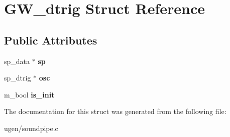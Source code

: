 \hypertarget{structGW__dtrig}{}\section{G\+W\+\_\+dtrig Struct Reference}
\label{structGW__dtrig}
\subsection*{Public Attributes}
\begin{DoxyCompactItemize}
\item 
\hypertarget{structGW__dtrig_acc37a380fd7b0d3cc3586b2cffd28155}{}\label{structGW__dtrig_acc37a380fd7b0d3cc3586b2cffd28155} 
sp\+\_\+data $\ast$ {\bfseries sp}
\item 
\hypertarget{structGW__dtrig_a3df2d1dc96272d163bed72061708cf1f}{}\label{structGW__dtrig_a3df2d1dc96272d163bed72061708cf1f} 
sp\+\_\+dtrig $\ast$ {\bfseries osc}
\item 
\hypertarget{structGW__dtrig_ad438477af32f2dc0769f2fb09dd87ccf}{}\label{structGW__dtrig_ad438477af32f2dc0769f2fb09dd87ccf} 
m\+\_\+bool {\bfseries is\+\_\+init}
\end{DoxyCompactItemize}


The documentation for this struct was generated from the following file\+:\begin{DoxyCompactItemize}
\item 
ugen/soundpipe.\+c\end{DoxyCompactItemize}
